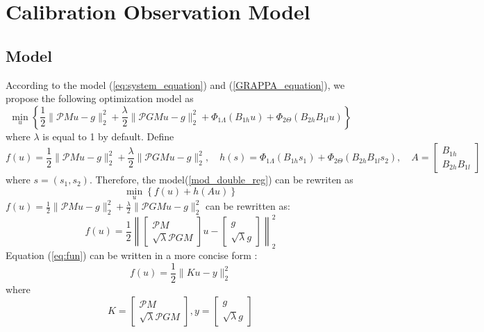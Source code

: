 \documentclass[UTF8]{article}
\begin{document}
\section{Calibration Observation Model}
\subsection{Model}
\par According to the model (\ref{eq:system_equation}) and (\ref{GRAPPA_equation}), we propose the following optimization model as
\begin{equation}\label{mod_double_reg}
	\min_{u} \left\{\frac{1}{2}\|\mathcal{P}Mu-g\|_2^2+  \frac{\lambda}{2}\|\mathcal{P}GMu-g \|_2^2 + \Phi_{1 \Lambda}(B_{1h} u) + \Phi_{2 \Theta}(B_{2h}B_{1l} u) \right\} 
\end{equation}
where $\lambda$ is equal to 1 by default. Define 
\begin{equation*}
	f(u) = \frac{1}{2}\|\mathcal{P}Mu-g\|_2^2+  \frac{\lambda}{2}\|\mathcal{P}GMu-g \|_2^2, \quad h(s) = \Phi_{1 \Lambda}(B_{1h} s_1) + \Phi_{2 \Theta}(B_{2h}B_{1l} s_2),\quad A = \begin{bmatrix}
		B_{1h} \\
		B_{2h}B_{1l}
	\end{bmatrix}
\end{equation*}
where $s = (s_1, s_2)$. Therefore, the model(\ref{mod_double_reg}) can be rewriten as 
\begin{equation}
	\min_{u} \left\{ f(u) + h(Au) \right\}
\end{equation}
$f(u) = \frac{1}{2}\|\mathcal{P}Mu-g\|_2^2+  \frac{\lambda}{2}\|\mathcal{P}GMu-g \|_2^2$ can be rewritten as:
\begin{equation}\label{eq:fun}
	f(u) = \frac{1}{2}\left 
	\|\begin{bmatrix}
		\mathcal{P}M \\
		\sqrt{\lambda}\mathcal{P}GM 
	\end{bmatrix} u - 
	\begin{bmatrix}
		g \\ \sqrt{\lambda}g
	\end{bmatrix}
	\right \|_2^2
\end{equation}
Equation (\ref{eq:fun}) can be written in a more concise form :
\begin{equation}
	f(u) = \frac{1}{2}\| Ku - y\|_2^2
\end{equation}
where 
\begin{equation*}\label{eq7}
	K = \begin{bmatrix}
		\mathcal{P}M \\
		\sqrt{\lambda}\mathcal{P}GM 
	\end{bmatrix},
	y = \begin{bmatrix}
		g \\
		\sqrt{\lambda}g
	\end{bmatrix}
\end{equation*}
\end{document}

